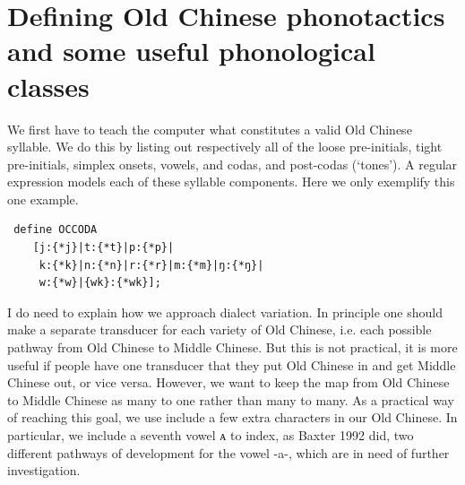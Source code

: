 \documentclass[xetex, svgnames, 12pt]{scrartcl}
\newcounter{para}
\begin{document}
\section{Defining Old Chinese phonotactics and some useful phonological classes}
We first have to teach the computer what constitutes a valid Old Chinese syllable. We do this by listing out respectively all of the loose pre-initials, tight pre-initials, simplex onsets, vowels, and codas, and post-codas (`tones'). A regular expression models each of these syllable components. Here we only exemplify this one example. 











 \begin{verbatim}
 define OCCODA 
    [j:{*j}|t:{*t}|p:{*p}|
     k:{*k}|n:{*n}|r:{*r}|m:{*m}|ŋ:{*ŋ}|
     w:{*w}|{wk}:{*wk}]; 
 \end{verbatim}
 

I do need to explain how we approach dialect variation. In principle one should make a separate transducer for each variety of Old Chinese, i.e. each possible pathway from Old Chinese to Middle Chinese. But this is not practical, it is more useful if people have one transducer that they put Old Chinese in and get Middle Chinese out, or vice versa. 
However, we want to keep the map from Old Chinese to Middle Chinese as many to one rather than many to many. 
As a practical way of reaching this goal, we use include a few extra characters in our Old Chinese. In particular, we include a seventh vowel ᴀ to index, as Baxter 1992 did, two different pathways of 
development for the vowel -a-, which are in need of further investigation.
\end{document}
